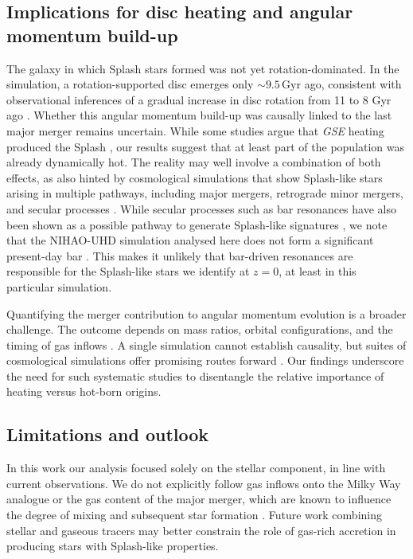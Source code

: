 \documentclass[fleqn,usenatbib]{mnras}
\begin{document}
\subsection{Implications for disc heating and angular momentum build-up}

The galaxy in which Splash stars formed was not yet rotation-dominated. In the simulation, a rotation-supported disc emerges only $\sim 9.5\,\mathrm{Gyr}$ ago, consistent with observational inferences of a gradual increase in disc rotation from 11 to 8 Gyr ago \citep[e.g.][]{MCM2013}. Whether this angular momentum build-up was causally linked to the last major merger remains uncertain. While some studies argue that \textit{GSE} heating produced the Splash \citep{Bonaca2020, DiMatteo2019}, our results suggest that at least part of the population was already dynamically hot. The reality may well involve a combination of both effects, as also hinted by cosmological simulations that show Splash-like stars arising in multiple pathways, including major mergers, retrograde minor mergers, and secular processes \citep{Dillamore2022, Dillamore2023, Dillamore2025, Kisku2025}. While secular processes such as bar resonances have also been shown as a possible pathway to generate Splash-like signatures \citep{Dillamore2022,Dillamore2023}, we note that the NIHAO-UHD simulation analysed here does not form a significant present-day bar \citep{Buder2025}. This makes it unlikely that bar-driven resonances are responsible for the Splash-like stars we identify at $z=0$, at least in this particular simulation.

Quantifying the merger contribution to angular momentum evolution is a broader challenge. The outcome depends on mass ratios, orbital configurations, and the timing of gas inflows \citep[e.g.][]{Lagos2017, Lagos2018}. A single simulation cannot establish causality, but suites of cosmological simulations offer promising routes forward \citep{Pillepich2019, SotilloRamos2022}. Our findings underscore the need for such systematic studies to disentangle the relative importance of heating versus hot-born origins.

\subsection{Limitations and outlook}

In this work our analysis focused solely on the stellar component, in line with current observations. We do not explicitly follow gas inflows onto the Milky Way analogue or the gas content of the major merger, which are known to influence the degree of mixing and subsequent star formation \citep{Agertz2021, Renaud2021b, Buck2023}. Future work combining stellar and gaseous tracers may better constrain the role of gas-rich accretion in producing stars with Splash-like properties.
\end{document}
